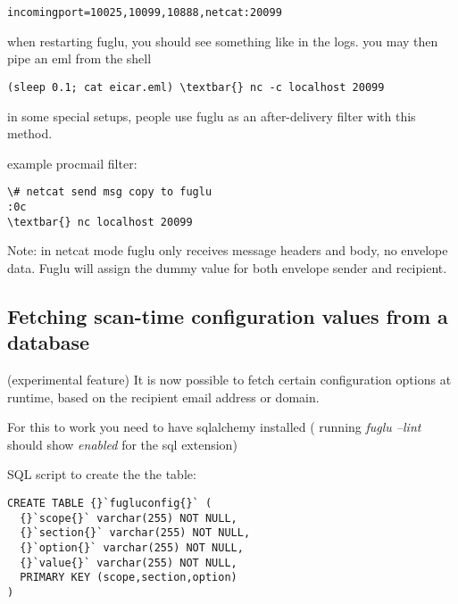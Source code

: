 \documentclass[letterpaper,10pt,english]{sphinxmanual}
\begin{document}
\begin{Verbatim}[commandchars=\\\{\}]
incomingport=10025,10099,10888,netcat:20099
\end{Verbatim}

when restarting fuglu, you should see something like  in the logs. you may then pipe an eml from the shell

\begin{Verbatim}[commandchars=\\\{\}]
(sleep 0.1; cat eicar.eml) \textbar{} nc -c localhost 20099
\end{Verbatim}

in some special setups, people use fuglu as an after-delivery filter with this method.

example procmail filter:

\begin{Verbatim}[commandchars=\\\{\}]
\# netcat send msg copy to fuglu
:0c
\textbar{} nc localhost 20099
\end{Verbatim}

Note: in netcat mode fuglu only receives message headers and body, no envelope data. Fuglu will assign the dummy value  for both envelope sender and recipient.


\subsection{Fetching scan-time configuration values from a database}
\label{configuration-index:fetching-scan-time-configuration-values-from-a-database}
(experimental feature) It is now possible to fetch certain configuration options at runtime, based on the recipient email address or domain.

For this to work you need to have sqlalchemy installed ( running \emph{fuglu --lint} should show \emph{enabled} for the sql extension)

SQL script to create the the table:

\begin{Verbatim}[commandchars=\\\{\}]
CREATE TABLE {}`fugluconfig{}` (
  {}`scope{}` varchar(255) NOT NULL,
  {}`section{}` varchar(255) NOT NULL,
  {}`option{}` varchar(255) NOT NULL,
  {}`value{}` varchar(255) NOT NULL,
  PRIMARY KEY (scope,section,option)
)
\end{Verbatim}
\end{document}
